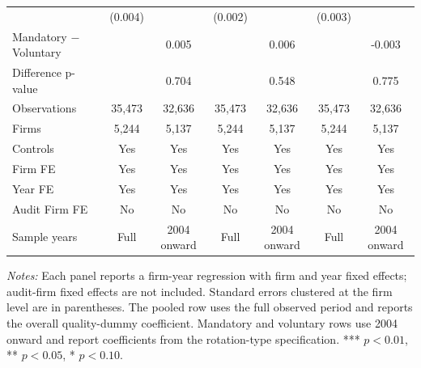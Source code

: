 \begin{table}[htbp]
\begin{threeparttable}
{\begin{tabular}{l cc cc cc}
 & (0.004) &  & (0.002) &  & (0.003) &  \\
Mandatory $-$ Voluntary &  & 0.005 &  & 0.006 &  & -0.003 \\
Difference p-value &  & 0.704 &  & 0.548 &  & 0.775 \\
Observations & 35,473 & 32,636 & 35,473 & 32,636 & 35,473 & 32,636 \\
Firms & 5,244 & 5,137 & 5,244 & 5,137 & 5,244 & 5,137 \\
\midrule
Controls & Yes & Yes & Yes & Yes & Yes & Yes \\
Firm FE & Yes & Yes & Yes & Yes & Yes & Yes \\
Year FE & Yes & Yes & Yes & Yes & Yes & Yes \\
Audit Firm FE & No & No & No & No & No & No \\
Sample years & Full & 2004 onward & Full & 2004 onward & Full & 2004 onward \\
\bottomrule
\end{tabular}}
\begin{tablenotes}\footnotesize
\item \textit{Notes:} Each panel reports a firm-year regression with firm and year fixed effects; audit-firm fixed effects are not included. Standard errors clustered at the firm level are in parentheses. The pooled row uses the full observed period and reports the overall quality-dummy coefficient. Mandatory and voluntary rows use 2004 onward and report coefficients from the rotation-type specification. *** \(p<0.01\), ** \(p<0.05\), * \(p<0.10\).
\end{tablenotes}
\end{threeparttable}
\end{table}
